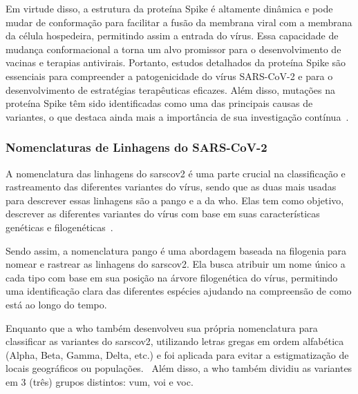 Em virtude disso, a estrutura da proteína Spike é altamente dinâmica e pode mudar de conformação para facilitar a fusão da membrana viral com a membrana da célula hospedeira, permitindo assim a entrada do vírus. Essa capacidade de mudança conformacional a torna um alvo promissor para o desenvolvimento de vacinas e terapias antivirais. Portanto, estudos detalhados da proteína Spike são essenciais para compreender a patogenicidade do vírus SARS-CoV-2 e para o desenvolvimento de estratégias terapêuticas eficazes. Além disso, mutações na proteína Spike têm sido identificadas como uma das principais causas de variantes, o que destaca ainda mais a importância de sua investigação contínua~\cite{covid19_cascella_2020}.

\subsubsection{Nomenclaturas de Linhagens do SARS-CoV-2}
A nomenclatura das linhagens do \gls{sarscov2} é uma parte crucial na classificação e rastreamento das diferentes variantes do vírus, sendo que as duas mais usadas para descrever essas linhagens são a \gls{pango} e a da \gls{who}. Elas tem como objetivo, descrever as diferentes variantes do vírus com base em suas características genéticas e filogenéticas~\cite{pango_rambaut_2020,who_variants}.

Sendo assim, a nomenclatura \gls{pango} é uma abordagem baseada na filogenia para nomear e rastrear as linhagens do \gls{sarscov2}. Ela busca atribuir um nome único a cada tipo com base em sua posição na árvore filogenética do vírus, permitindo uma identificação clara das diferentes espécies ajudando na compreensão de como está ao longo do tempo.~\cite{pango_rambaut_2020}

Enquanto que a \gls{who} também desenvolveu sua própria nomenclatura para classificar as variantes do \gls{sarscov2}, utilizando letras gregas em ordem alfabética (Alpha, Beta, Gamma, Delta, etc.) e foi aplicada para evitar a estigmatização de locais geográficos ou populações.~\cite{who_variants} Além disso, a \gls{who} também dividiu as variantes em 3 (três) grupos distintos: \gls{vum}, \gls{voi} e \gls{voc}.

